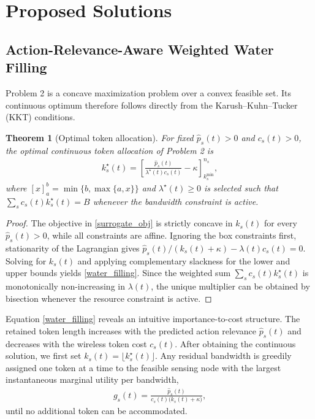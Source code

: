 \documentclass[lettersize,journal]{IEEEtran}
\theoremstyle{custom}
\newtheorem{Thm}{Theorem}
\begin{document}
\section{Proposed Solutions}
\subsection{Action-Relevance-Aware Weighted Water Filling}
Problem 2 is a concave maximization problem over a convex feasible set. Its continuous optimum therefore follows directly from the Karush--Kuhn--Tucker (KKT) conditions.

\begin{Thm}[Optimal token allocation]
For fixed $\widehat p_s(t)>0$ and $c_s(t)>0$, the optimal continuous token allocation of Problem 2 is
\begin{align}
    k_s^{\star}(t)
    = \left[
    \frac{\widehat p_s(t)}{\lambda^{\star}(t)c_s(t)}-\kappa
    \right]_{k_s^{\min}}^{n_s},
    \label{water_filling}
\end{align}
where $[x]_a^b=\min\{b,\max\{a,x\}\}$ and $\lambda^{\star}(t)\geq0$ is selected such that $\sum_s c_s(t)k_s^{\star}(t)=B$ whenever the bandwidth constraint is active.
\end{Thm}
\begin{proof}
The objective in \eqref{surrogate_obj} is strictly concave in $k_s(t)$ for every $\widehat p_s(t)>0$, while all constraints are affine. Ignoring the box constraints first, stationarity of the Lagrangian gives
$\widehat p_s(t)/(k_s(t)+\kappa)-\lambda(t)c_s(t)=0$.
Solving for $k_s(t)$ and applying complementary slackness for the lower and upper bounds yields \eqref{water_filling}. Since the weighted sum $\sum_s c_s(t)k_s^{\star}(t)$ is monotonically non-increasing in $\lambda(t)$, the unique multiplier can be obtained by bisection whenever the resource constraint is active.
\end{proof}

Equation \eqref{water_filling} reveals an intuitive importance-to-cost structure. The retained token length increases with the predicted action relevance $\widehat p_s(t)$ and decreases with the wireless token cost $c_s(t)$. After obtaining the continuous solution, we first set $k_s(t)=\lfloor k_s^{\star}(t)\rfloor$. Any residual bandwidth is greedily assigned one token at a time to the feasible sensing node with the largest instantaneous marginal utility per bandwidth,
\begin{align}
    g_s(t)=\frac{\widehat p_s(t)}{c_s(t)\big(k_s(t)+\kappa\big)},
    \label{rounding_gain}
\end{align}
until no additional token can be accommodated.
\end{document}
